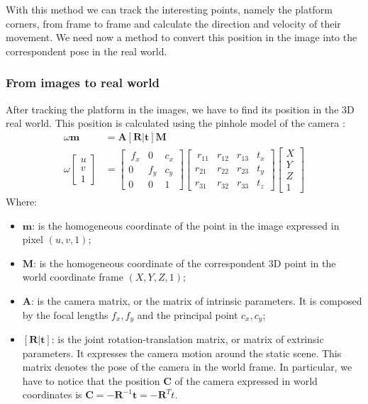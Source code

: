 With this method we can track the interesting points, namely the platform corners, from frame to frame and calculate the direction and velocity of their movement. We need now a method to convert this position in the image into the correspondent pose in the real world.

\subsubsection{From images to real world}
After tracking the platform in the images, we have to find its position in the 3D real world. This position is calculated using the pinhole model of the camera \cite{weng1992camera}:
\begin{subequations}
\begin{align}
\omega \boldsymbol{m} \ \ & = \boldsymbol{A} [\boldsymbol{R}|\boldsymbol{t}]\boldsymbol{M} \\[10pt]
{\omega \begin{bmatrix}
u \\[10pt]
v  \\[10pt]
1
\end{bmatrix}} & =
{\begin{bmatrix}\
f_x & 0 & c_x \\[10pt]
0 & f_y &c_y \\[10pt]
0 & 0 & 1
\end{bmatrix}}
{\begin{bmatrix}\
r_{11} & r_{12} & r_{13} & t_{x} \\[10pt]
r_{21} & r_{22} & r_{23} & t_{y} \\[10pt]
r_{31} & r_{32} & r_{33} & t_{z}
\end{bmatrix}}
{\begin{bmatrix}
X \\[5pt]
Y \\[5pt]
Z \\[5pt]
1
\end{bmatrix}}
 \label{eq:pinholemodel}
\end{align}
\end{subequations}
Where:
\begin{itemize}
 \item $\boldsymbol{m}$: is the homogeneous coordinate of the point in the image expressed in pixel $(u,v,1)$;
  \item $\boldsymbol{M}$: is the homogeneous coordinate of the correspondent 3D point in the world coordinate frame $(X,Y,Z,1)$;
 \item $\boldsymbol{A}$: is the camera matrix, or the matrix of intrinsic parameters. It is composed by the focal lengths $f_x,f_y$  and the principal point $c_x,c_y$;
 \item $[\boldsymbol{R}|\boldsymbol{t}]$: is the joint rotation-translation matrix, or matrix of extrinsic parameters. It expresses the camera motion around the static scene. This matrix denotes the pose of the camera in the world frame. In particular, we have to notice that the position $\boldsymbol{C}$ of the camera expressed in world coordinates is $\boldsymbol{C}=-\boldsymbol{R}^{{-1}}\boldsymbol{t}=-\boldsymbol{R}^{T}t$.
\end{itemize}


